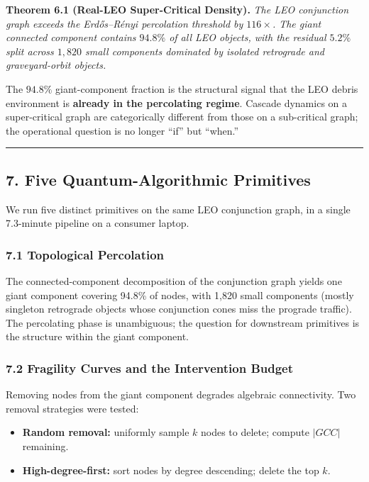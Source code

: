 \documentclass[
]{article}
\providecommand{\tightlist}{%
  \setlength{\itemsep}{0pt}\setlength{\parskip}{0pt}}
\begin{document}
\textbf{Theorem 6.1 (Real-LEO Super-Critical Density).} \emph{The LEO
conjunction graph exceeds the Erdős--Rényi percolation threshold by
\(116\times\). The giant connected component contains \(94.8\%\) of all
LEO objects, with the residual \(5.2\%\) split across \(1{,}820\) small
components dominated by isolated retrograde and graveyard-orbit
objects.}

The \(94.8\%\) giant-component fraction is the structural signal that
the LEO debris environment is \textbf{already in the percolating
regime}. Cascade dynamics on a super-critical graph are categorically
different from those on a sub-critical graph; the operational question
is no longer ``if'' but ``when.''

\begin{center}\rule{0.5\linewidth}{0.5pt}\end{center}

\subsection{7. Five Quantum-Algorithmic
Primitives}\label{five-quantum-algorithmic-primitives}

We run five distinct primitives on the same LEO conjunction graph, in a
single 7.3-minute pipeline on a consumer laptop.

\subsubsection{7.1 Topological
Percolation}\label{topological-percolation}

The connected-component decomposition of the conjunction graph yields
one giant component covering 94.8\% of nodes, with 1,820 small
components (mostly singleton retrograde objects whose conjunction cones
miss the prograde traffic). The percolating phase is unambiguous; the
question for downstream primitives is the structure within the giant
component.

\subsubsection{7.2 Fragility Curves and the Intervention
Budget}\label{fragility-curves-and-the-intervention-budget}

Removing nodes from the giant component degrades algebraic connectivity.
Two removal strategies were tested:

\begin{itemize}
\tightlist
\item
  \textbf{Random removal:} uniformly sample \(k\) nodes to delete;
  compute \(|GCC|\) remaining.
\item
  \textbf{High-degree-first:} sort nodes by degree descending; delete
  the top \(k\).
\end{itemize}
\end{document}
